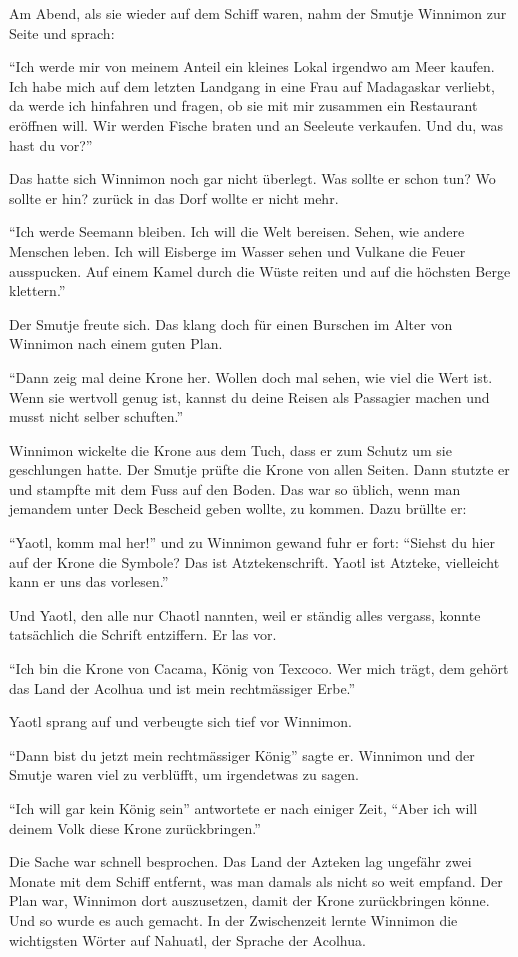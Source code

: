 Am Abend, als sie wieder auf dem Schiff waren, nahm der Smutje Winnimon zur Seite und sprach:

\enquote{Ich werde mir von meinem Anteil ein kleines Lokal irgendwo am Meer kaufen. Ich habe mich auf dem letzten Landgang in eine Frau auf Madagaskar verliebt, da werde ich hinfahren und fragen, ob sie mit mir zusammen ein Restaurant eröffnen will. Wir werden Fische braten und an Seeleute verkaufen. Und du, was hast du vor?}

Das hatte sich Winnimon noch gar nicht überlegt. Was sollte er schon tun? Wo sollte er hin? zurück in das Dorf wollte er nicht mehr. 

\enquote{Ich werde Seemann bleiben. Ich will die Welt bereisen. Sehen, wie andere Menschen leben. Ich will Eisberge im Wasser sehen und Vulkane die Feuer ausspucken. Auf einem Kamel durch die Wüste reiten und auf die höchsten Berge klettern.}

Der Smutje freute sich. Das klang doch für einen Burschen im Alter von Winnimon nach einem guten Plan.

\enquote{Dann zeig mal deine Krone her. Wollen doch mal sehen, wie viel die Wert ist. Wenn sie wertvoll genug ist, kannst du deine Reisen als Passagier machen und musst nicht selber schuften.}

Winnimon wickelte die Krone aus dem Tuch, dass er zum Schutz um sie geschlungen hatte. Der Smutje prüfte die Krone von allen Seiten. Dann stutzte er und stampfte mit dem Fuss auf den Boden. Das war so üblich, wenn man jemandem unter Deck Bescheid geben wollte, zu kommen. Dazu brüllte er:

\enquote{Yaotl, komm mal her!} und zu Winnimon gewand fuhr er fort: \enquote{Siehst du hier auf der Krone die Symbole? Das ist Atztekenschrift. Yaotl ist Atzteke, vielleicht kann er uns das vorlesen.}

Und Yaotl, den alle nur Chaotl nannten, weil er ständig alles vergass, konnte tatsächlich die Schrift entziffern. Er las vor.

\enquote{Ich bin die Krone von Cacama, König von Texcoco. Wer mich trägt, dem gehört das Land der Acolhua und ist mein rechtmässiger Erbe.}

Yaotl sprang auf und verbeugte sich tief vor Winnimon.

\enquote{Dann bist du jetzt mein rechtmässiger König} sagte er. Winnimon und der Smutje waren viel zu verblüfft, um irgendetwas zu sagen.

\enquote{Ich will gar kein König sein} antwortete er nach einiger Zeit, \enquote{Aber ich will deinem Volk diese Krone zurückbringen.}

Die Sache war schnell besprochen. Das Land der Azteken lag ungefähr zwei Monate mit dem Schiff entfernt, was man damals als nicht so weit empfand. Der Plan war, Winnimon dort auszusetzen, damit der Krone zurückbringen könne. Und so wurde es auch gemacht. In der Zwischenzeit lernte Winnimon die wichtigsten Wörter auf Nahuatl, der Sprache der Acolhua.




  \hfill {\color{red}\decofourleft}
